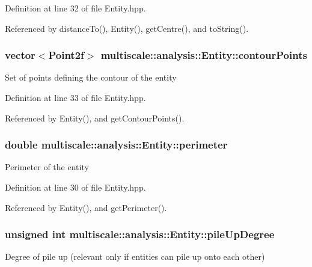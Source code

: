Definition at line 32 of file Entity.\-hpp.



Referenced by distance\-To(), Entity(), get\-Centre(), and to\-String().

\hypertarget{classmultiscale_1_1analysis_1_1Entity_a0199b0a0e5b22809015ecbc23d17785e}{
\subsubsection[{contour\-Points}]{\setlength{\rightskip}{0pt plus 5cm}vector$<$Point2f$>$ multiscale\-::analysis\-::\-Entity\-::contour\-Points\hspace{0.3cm}{\ttfamily [private]}}}\label{classmultiscale_1_1analysis_1_1Entity_a0199b0a0e5b22809015ecbc23d17785e}
Set of points defining the contour of the entity 

Definition at line 33 of file Entity.\-hpp.



Referenced by Entity(), and get\-Contour\-Points().

\hypertarget{classmultiscale_1_1analysis_1_1Entity_ac7bcdb1cb5eb4369ca8e44d3dbda44a3}{
\subsubsection[{perimeter}]{\setlength{\rightskip}{0pt plus 5cm}double multiscale\-::analysis\-::\-Entity\-::perimeter\hspace{0.3cm}{\ttfamily [private]}}}\label{classmultiscale_1_1analysis_1_1Entity_ac7bcdb1cb5eb4369ca8e44d3dbda44a3}
Perimeter of the entity 

Definition at line 30 of file Entity.\-hpp.



Referenced by Entity(), and get\-Perimeter().

\hypertarget{classmultiscale_1_1analysis_1_1Entity_aae78866cef9fcb7bd2e858570f47d082}{
\subsubsection[{pile\-Up\-Degree}]{\setlength{\rightskip}{0pt plus 5cm}unsigned int multiscale\-::analysis\-::\-Entity\-::pile\-Up\-Degree\hspace{0.3cm}{\ttfamily [private]}}}\label{classmultiscale_1_1analysis_1_1Entity_aae78866cef9fcb7bd2e858570f47d082}
Degree of pile up (relevant only if entities can pile up onto each other) 

